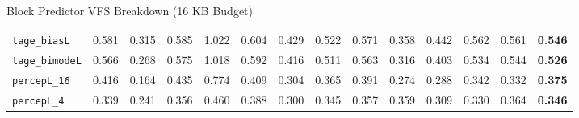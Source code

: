 \documentclass[aspectratio=169]{beamer}
\begin{document}
\begin{frame}[noframenumbering]{Block Predictor VFS Breakdown (16 KB Budget)}
\begin{table}
{\begin{tabular}{|lcccccccccccc|c|}
        \texttt{tage\_biasL} & 0.581 & 0.315 & 0.585 & 1.022 & 0.604 & 0.429 & 0.522 & 0.571 & 0.358 & 0.442 & 0.562 & 0.561 & \textbf{0.546} \\
        \texttt{tage\_bimodeL} & 0.566 & 0.268 & 0.575 & 1.018 & 0.592 & 0.416 & 0.511 & 0.563 & 0.316 & 0.403 & 0.534 & 0.544 & \textbf{0.526} \\
        \texttt{percepL\_16} & 0.416 & 0.164 & 0.435 & 0.774 & 0.409 & 0.304 & 0.365 & 0.391 & 0.274 & 0.288 & 0.342 & 0.332 & \textbf{0.375} \\
        \texttt{percepL\_4} & 0.339 & 0.241 & 0.356 & 0.460 & 0.388 & 0.300 & 0.345 & 0.357 & 0.359 & 0.309 & 0.330 & 0.364 & \textbf{0.346} \\
        \hline
        \end{tabular}%
        }
    \end{table}
\end{frame}
\end{document}
